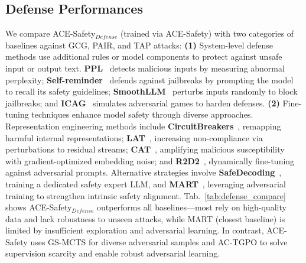 \documentclass[11pt]{article}
\def\framework{ACE-Safety}
\def\attackmethod{GS-MCTS}
\def\trainingmethod{AC-TGPO}
\begin{document}
\subsection{Defense Performances}
We compare {\framework}$_{Defense}$ (trained via {\framework}) with two categories of baselines against GCG, PAIR, and TAP attacks: \textbf{(1)} System-level defense methods use additional rules or model components to protect against unsafe input or output text. \textbf{PPL}~\citep{PPL} detects malicious inputs by measuring abnormal perplexity; \textbf{Self-reminder}~\citep{selfreminder} defends against jailbreaks by prompting the model to recall its safety guidelines; \textbf{SmoothLLM}~\citep{smoothllm} perturbs inputs randomly to block jailbreaks; and \textbf{ICAG}~\citep{ICAG}  simulates adversarial games to harden defenses. \textbf{(2)} Fine-tuning techniques enhance model safety through diverse approaches. Representation engineering methods include \textbf{CircuitBreakers}~\citep{circuitbreakers}, remapping harmful internal representations; \textbf{LAT}~\citep{LAT}, increasing non-compliance via perturbations to residual streams; \textbf{CAT}~\citep{CAT}, amplifying malicious susceptibility with gradient-optimized embedding noise; and \textbf{R2D2}~\citep{mazeika2024harmbench}, dynamically fine-tuning against adversarial prompts. Alternative strategies involve \textbf{SafeDecoding}~\citep{safedecoding}, training a dedicated safety expert LLM, and \textbf{MART}~\citep{MART}, leveraging adversarial training to strengthen intrinsic safety alignment. Tab.~\ref{tab:defense_compare} shows {\framework}$_{Defense}$ outperforms all baselines—most rely on high-quality data and lack robustness to unseen attacks, while MART (closest baseline) is limited by insufficient exploration and adversarial learning. In contrast, {\framework} uses {\attackmethod} for diverse adversarial samples and {\trainingmethod} to solve supervision scarcity and enable robust adversarial learning.
\end{document}
